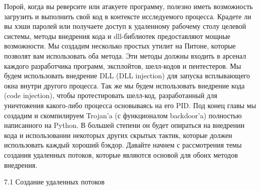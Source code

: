 \documentclass[12pt, a4paper, oneside]{book}
\begin{document}
Порой, когда вы реверсите или атакуете программу, полезно иметь возможность загрузить и выполнить свой код в контексте исследуемого процесса. Крадете ли вы хэши паролей или получаете доступ к удаленному рабочему столу целевой системы, методы внедрения кода и dll-библиотек предоставляют мощные возможности. Мы создадим несколько простых утилит на Питоне, которые позволят вам использовать оба метода. Эти методы должны входить в арсенал каждого разработчика программ, эксплойтов, шелл-кодов и пентестеров. Мы будем использовать внедрение DLL (DLL injection) для запуска всплывающего окна внутри другого процесса. Так же мы будем использовать внедрение кода (code injection), чтобы протестировать шелл-код, разработанный для уничтожения какого-либо процесса основываясь на его PID. Под конец главы мы создадим и скомпилируем Trojan’a (с функционалом backdoor’a) полностью написанного на Python. В большей степени он будет опираться на внедрении кода и использовании некоторых других скрытых тактик, которые должен использовать каждый хороший бэкдор. Давайте начнем с рассмотрения темы создания удаленных потоков, которые являются основой для обоих методов внедрения.


7.1 Создание удаленных потоков
\end{document}
